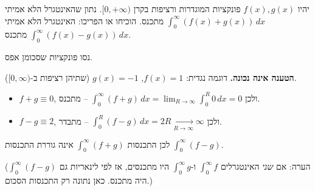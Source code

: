 
\begin{question}
יהיו $f(x),g(x)$ פונקציות המוגדרות ורציפות בקרן $[0,+\infty)$. נתון שהאינטגרל הלא אמיתי $\int_0^\infty(f(x)+g(x))\,dx$ מתכנס.
הוכיחו או הפריכו:
האינטגרל הלא אמיתי $\int_0^\infty(f(x)-g(x))\,dx$ מתכנס.
\end{question}

\begin{hint}
נסו פונקציות שסכומן אפס.
\end{hint}

\begin{solution}
\textbf{הטענה אינה נכונה.} דוגמה נגדית: $f(x)=1$, $g(x)=-1$ (שתיהן רציפות ב-$[0,\infty)$).
\begin{itemize}
  \item $f+g\equiv0$, ולכן $\int_0^\infty(f+g)\,dx=\lim_{R\to\infty}\int_0^R0\,dx=0$ -- מתכנס.
  \item $f-g\equiv2$, ולכן $\int_0^R(f-g)\,dx=2R\xrightarrow[R\to\infty]{}\infty$ -- מתבדר.
\end{itemize}
לכן התכנסות $\int_0^\infty(f+g)$ אינה גוררת התכנסות $\int_0^\infty(f-g)$.

(הערה: אם \emph{שני} האינטגרלים $\int_0^\infty f$ ו-$\int_0^\infty g$ היו מתכנסים, אז לפי לינאריות גם $\int_0^\infty(f-g)$ היה מתכנס. כאן נתונה רק התכנסות הסכום.)
\end{solution}
